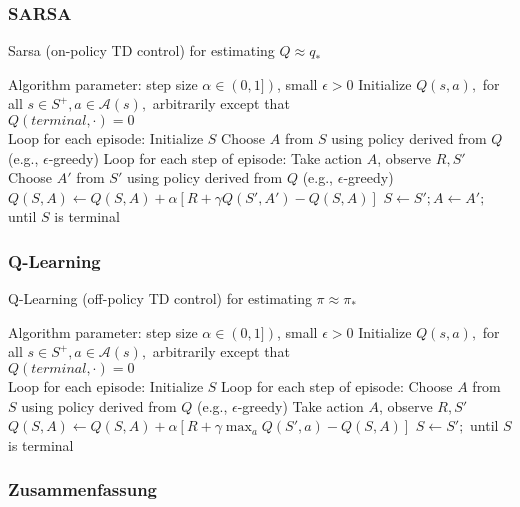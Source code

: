 \pagebreak
\subsubsection{SARSA}
\begin{algorithm}
    \caption{Sarsa (on-policy TD control) for estimating $Q \approx q_*$}
    \begin{algorithmic}[1]
        \State Algorithm parameter: step size $\alpha \in (0,1])$, small $\epsilon > 0$
        \State Initialize $Q(s,a),$ for all $s \in S^+, a \in \mathcal{A}(s),$ arbitrarily except that \\ $Q(terminal, \mathord{\cdot}) = 0$
        \\
        \State Loop for each episode:
        \Indent
            \State Initialize $S$
            \State Choose $A$ from $S$ using policy derived from $Q$ (e.g., $\epsilon$-greedy)
            \State Loop for each step of episode:
            \Indent
                \State Take action $A$, observe $R, S'$
                \State Choose $A'$ from $S'$ using policy derived from $Q$ (e.g., $\epsilon$-greedy)
                \State $Q(S,A) \gets Q(S,A) + \alpha [R + \gamma Q(S',A') - Q(S,A)]$
                \State $S \gets S'; A \gets A';$
            \EndIndent
            \State until $S$ is terminal
        \EndIndent 
    \end{algorithmic}
\end{algorithm}


\pagebreak
\subsubsection{Q-Learning}
\begin{algorithm}
    \caption{Q-Learning (off-policy TD control) for estimating $\pi \approx \pi_*$}
    \begin{algorithmic}[1]
        \State Algorithm parameter: step size $\alpha \in (0,1])$, small $\epsilon > 0$
        \State Initialize $Q(s,a),$ for all $s \in S^+, a \in \mathcal{A}(s),$ arbitrarily except that \\ $Q(terminal, \mathord{\cdot}) = 0$
        \\
        \State Loop for each episode:
        \Indent
            \State Initialize $S$
            \State Loop for each step of episode:
            \Indent
                \State Choose $A$ from $S$ using policy derived from $Q$ (e.g., $\epsilon$-greedy)
                \State Take action $A$, observe $R, S'$
                \State $Q(S,A) \gets Q(S,A) + \alpha [R + \gamma \max_a Q(S',a) - Q(S,A)]$
                \State $S \gets S';$
            \EndIndent
            \State until $S$ is terminal
        \EndIndent 
    \end{algorithmic}
\end{algorithm}

\subsubsection{Zusammenfassung}
